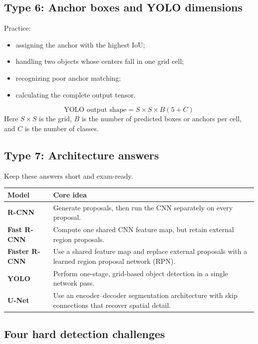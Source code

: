 \documentclass[11pt]{article}
\begin{document}
\subsection{Type 6: Anchor boxes and YOLO dimensions}

Practice:

\begin{itemize}
  \item assigning the anchor with the highest IoU;
  \item handling two objects whose centers fall in one grid cell;
  \item recognizing poor anchor matching;
  \item calculating the complete output tensor.
\end{itemize}

\begin{formulabox}
\[
\boxed{\text{YOLO output shape}=S\times S\times B(5+C)}
\]
Here \(S\times S\) is the grid, \(B\) is the number of predicted boxes or anchors per cell, and \(C\) is the number of classes.
\end{formulabox}

\newpage
\subsection{Type 7: Architecture answers}

Keep these answers short and exam-ready.

\begin{center}
\small
\begin{tabularx}{\textwidth}{>{\bfseries}p{2.9cm} X}
\toprule
Model & Core idea \\
\midrule
R-CNN & Generate proposals, then run the CNN separately on every proposal. \\
Fast R-CNN & Compute one shared CNN feature map, but retain external region proposals. \\
Faster R-CNN & Use a shared feature map and replace external proposals with a learned region proposal network (RPN). \\
YOLO & Perform one-stage, grid-based object detection in a single network pass. \\
U-Net & Use an encoder--decoder segmentation architecture with skip connections that recover spatial detail. \\
\bottomrule
\end{tabularx}
\end{center}

\subsection{Four hard detection challenges}
\end{document}
